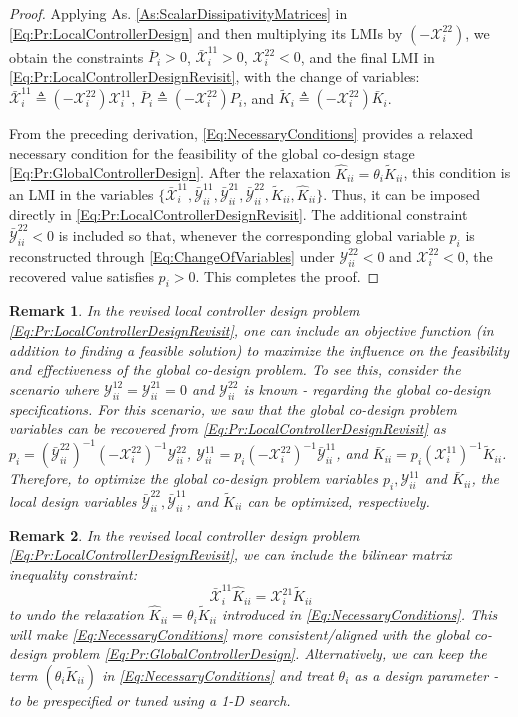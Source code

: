 \documentclass[letterpaper, 10 pt, conference]{ieeeconf}%
\newcommand{\0}{\mathbf{0}}
\newcommand{\X}{\mathcal{X}}
\newcommand{\Y}{\mathcal{Y}}
\newcommand{\x}{{\scriptstyle \X}}
\newcommand{\y}{{\scriptstyle \Y}}
\newtheorem{remark}{\textbf{Remark}}
\begin{document}
\begin{proof}
Applying As. \ref{As:ScalarDissipativityMatrices} in \eqref{Eq:Pr:LocalControllerDesign} and then multiplying its LMIs by $(-\x_i^{22})$, 
we obtain the constraints \(\bar P_i>0\), \(\bar{\x}_i^{11}>0\), \(\x_i^{22}<0\), and the final LMI in \eqref{Eq:Pr:LocalControllerDesignRevisit}, with the change of variables: $\bar{\x}_i^{11}\triangleq (-\x_i^{22})\x_i^{11}$, $\bar{P}_i \triangleq (-\x_i^{22}) P_i$, and $\tilde{K}_i \triangleq (-\x_i^{22})\bar{K}_i$.

From the preceding derivation, \eqref{Eq:NecessaryConditions} provides a relaxed necessary condition for the feasibility of the global co-design stage \eqref{Eq:Pr:GlobalControllerDesign}. After the relaxation 
$\hat K_{ii}=\theta_i\tilde K_{ii}$, this condition is an LMI in the variables 
$\{\bar{\x}_i^{11},\bar{\y}_{ii}^{11},\bar{\y}_{ii}^{21},\bar{\y}_{ii}^{22},\tilde K_{ii},\hat K_{ii}\}$. 
Thus, it can be imposed directly in \eqref{Eq:Pr:LocalControllerDesignRevisit}. The additional constraint $\bar{\y}_{ii}^{22}<0$ is included so that, whenever the corresponding global variable $p_i$ is reconstructed through \eqref{Eq:ChangeOfVariables} under $\y_{ii}^{22}<0$ and $\x_i^{22}<0$, the recovered value satisfies $p_i>0$. This completes the proof.
\end{proof}
 



\begin{remark}
In the revised local controller design problem \eqref{Eq:Pr:LocalControllerDesignRevisit}, one can include an objective function (in addition to finding a feasible solution) to maximize the influence on the feasibility and effectiveness of the global co-design problem. To see this, consider the scenario where 
$\y_{ii}^{12}=\y_{ii}^{21}=0$ and $\y_{ii}^{22}$ is known - regarding the global co-design specifications. For this scenario, we saw that the global co-design problem variables can be recovered from \eqref{Eq:Pr:LocalControllerDesignRevisit} as 
$p_i = (\bar{\y}_{ii}^{22})^{-1}(-\x_i^{22})^{-1} \y_{ii}^{22}$, 
$\y_{ii}^{11} = p_i(-\x_i^{22})^{-1}\bar{\y}_{ii}^{11}$, 
and 
$\bar{K}_{ii} = p_i(\x_i^{11})^{-1}\tilde{K}_{ii}$. Therefore, to optimize the global co-design problem variables $p_i, \y^{11}_{ii}$ and $\bar{K}_{ii}$, the local design variables $\bar{\y}_{ii}^{22}, \bar{\y}_{ii}^{11}$, and $\tilde K_{ii}$ can be optimized, respectively.
\end{remark}


\begin{remark}
In the revised local controller design problem \eqref{Eq:Pr:LocalControllerDesignRevisit}, we can include the bilinear matrix inequality constraint:
$$
\bar{\x}_i^{11}\hat{K}_{ii} = \x_i^{21}\tilde{K}_{ii} 
$$
to undo the relaxation $\hat{K}_{ii} = \theta_i\tilde{K}_{ii}$ introduced in \eqref{Eq:NecessaryConditions}. This will make \eqref{Eq:NecessaryConditions} more consistent/aligned with the global co-design problem \eqref{Eq:Pr:GlobalControllerDesign}. Alternatively, we can keep the term $(\theta_i\tilde{K}_{ii})$ in \eqref{Eq:NecessaryConditions} and treat $\theta_i$ as a design parameter - to be prespecified or tuned using a 1-D search. 
\end{remark}
\end{document}
